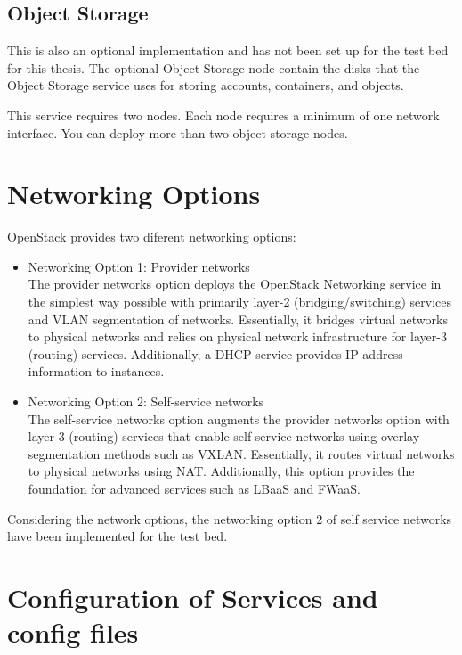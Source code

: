 \subsection{Object Storage}\label{ssec:hwobjectstorage}
This is also an optional implementation and has not been set up for the test bed for this thesis.
The optional Object Storage node contain the disks that the Object Storage service uses for storing accounts, containers, and objects.

This service requires two nodes.
Each node requires a minimum of one network interface.
You can deploy more than two object storage nodes.

\section{Networking Options}\label{sec:Networkingoptions}
OpenStack provides two diferent networking options:
\begin{itemize}
	\item Networking Option 1: Provider networks
	\\The provider networks option deploys the OpenStack Networking service in the simplest way possible with primarily layer-2 (bridging/switching) services and VLAN segmentation of networks.
	Essentially, it bridges virtual networks to physical networks and relies on physical network infrastructure for layer-3 (routing) services.
	Additionally, a DHCP service provides IP address information to instances.

	\item Networking Option 2: Self-service networks
	\\The self-service networks option augments the provider networks option with layer-3 (routing) services that enable self-service networks using overlay segmentation methods such as VXLAN.
	Essentially, it routes virtual networks to physical networks using NAT.
	Additionally, this option provides the foundation for advanced services such as LBaaS and FWaaS.
\end{itemize}

Considering the network options, the networking option 2 of self service networks have been implemented for the test bed.


\section{Configuration of Services and config files}\label{sec:configurationofopenstack}

